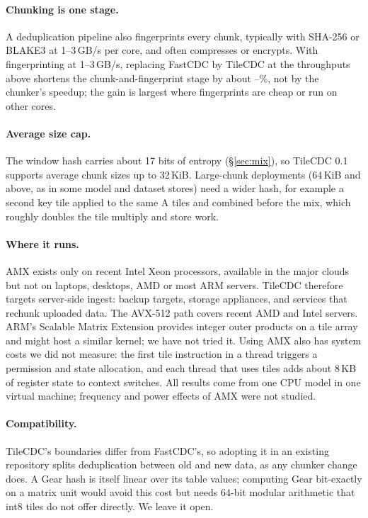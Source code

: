 \documentclass[10pt,twocolumn]{article}
\begin{document}
\paragraph{Chunking is one stage.} A deduplication pipeline also fingerprints every chunk, typically with SHA-256 or BLAKE3 at 1--3\,GB/s per core, and often compresses or encrypts. With fingerprinting at 1--3\,GB/s, replacing FastCDC by TileCDC at the throughputs above shortens the chunk-and-fingerprint stage by about \stageRedLo--\stageRedHi\%, not by the chunker's speedup; the gain is largest where fingerprints are cheap or run on other cores.

\paragraph{Average size cap.} The window hash carries about 17 bits of entropy (\S\ref{sec:mix}), so TileCDC 0.1 supports average chunk sizes up to 32\,KiB. Large-chunk deployments (64\,KiB and above, as in some model and dataset stores) need a wider hash, for example a second key tile applied to the same A tiles and combined before the mix, which roughly doubles the tile multiply and store work.

\paragraph{Where it runs.} AMX exists only on recent Intel Xeon processors, available in the major clouds but not on laptops, desktops, AMD or most ARM servers. TileCDC therefore targets server-side ingest: backup targets, storage appliances, and services that rechunk uploaded data. The AVX-512 path covers recent AMD and Intel servers. ARM's Scalable Matrix Extension provides integer outer products on a tile array and might host a similar kernel; we have not tried it. Using AMX also has system costs we did not measure: the first tile instruction in a thread triggers a permission and state allocation, and each thread that uses tiles adds about 8\,KB of register state to context switches. All results come from one CPU model in one virtual machine; frequency and power effects of AMX were not studied.

\paragraph{Compatibility.} TileCDC's boundaries differ from FastCDC's, so adopting it in an existing repository splits deduplication between old and new data, as any chunker change does. A Gear hash is itself linear over its table values; computing Gear bit-exactly on a matrix unit would avoid this cost but needs 64-bit modular arithmetic that int8 tiles do not offer directly. We leave it open.
\end{document}

